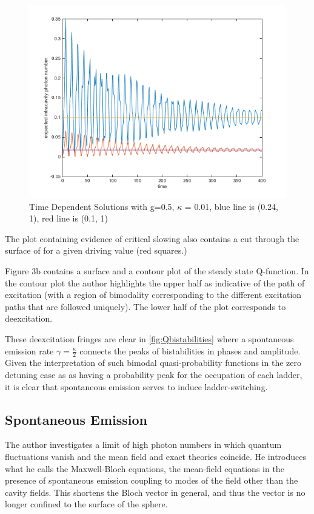 \begin{figure}[h]
  \centering
  \includegraphics[width=1\textwidth]{Images/CriticalSlowing.png}
  \caption{Time Dependent Solutions with g=0.5, $\kappa$ = 0.01, blue line is (0.24, 1), red line is (0.1, 1)}\label{fig:CriticalSlowing}
\end{figure}

The plot containing evidence of critical slowing also contains a cut through the surface of \autocite[Figure 2]{Carmichael2015} for a given driving value (red squares.)

Figure 3b contains a surface and a contour plot of the steady state Q-function. In the contour plot the author highlights the upper half as indicative of the path of excitation (with a region of bimodality corresponding to the different excitation paths that are followed uniquely). The lower half of the plot corresponds to deexcitation.

These deexcitation fringes are clear in \ref{fig:Qbistabilities} where a spontaneous emission rate $ \gamma = \frac{\kappa}{2}$ connects the peaks of bistabilities in phases and amplitude. Given the interpretation of such bimodal quasi-probability functions in the zero detuning case as as having a probability peak for the occupation of each ladder, it is clear that spontaneous emission serves to induce ladder-switching.
\subsection{Spontaneous Emission}

The author investigates a limit of high photon numbers in which quantum fluctuations vanish and the mean field and exact theories coincide. He introduces what he calls the Maxwell-Bloch equations, the mean-field equations in the presence of spontaneous emission coupling to modes of the field other than the cavity fields. This shortens the Bloch vector in general, and thus the vector is no longer confined to the surface of the sphere.

